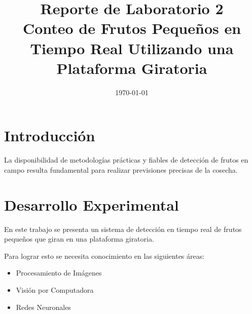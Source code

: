 \documentclass[conference]{IEEEtran}
\date{\specialdate\today}
\begin{document}
\newcommand{\breite}{0.9} %
\newcommand{\RelacionFiguradoscolumnas}{0.9}
\newcommand{\RelacionFiguradoscolumnasPuntoCinco}{0.45}

\title{Reporte de Laboratorio 2 \\ Conteo de Frutos Pequeños en Tiempo Real Utilizando una Plataforma Giratoria}

\author{
}

\maketitle

\begin{abstract} 
    
\end{abstract}

\section{Introducción}
La disponibilidad de metodologías prácticas y fiables de detección de frutos en campo resulta fundamental para realizar previsiones precisas de la cosecha\cite{}. 


\section{Desarrollo Experimental}
En este trabajo se presenta un sistema de detección en tiempo real de frutos pequeños que giran en una plataforma giratoria.

Para lograr esto se necesita conocimiento en las siguientes áreas:
\begin{itemize}
    \item Procesamiento de Imágenes
    \item Visión por Computadora
    \item Redes Neuronales
\end{itemize}
\end{document}
